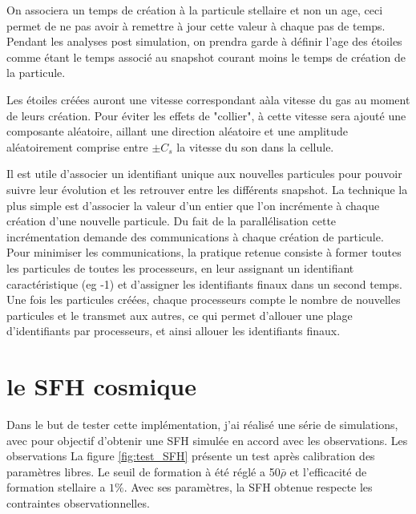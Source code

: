On associera un temps de création à la particule stellaire et non un age, ceci permet de ne pas avoir à remettre à jour cette valeur à chaque pas de temps.
Pendant les analyses post simulation, on prendra garde à définir l'age des étoiles comme étant le temps associé au snapshot courant moins le temps de création de la particule.

Les étoiles créées auront une vitesse correspondant aàla vitesse du gas au moment de leurs création.
Pour éviter les effets de "collier", à cette vitesse sera ajouté une composante aléatoire, aillant une direction aléatoire et une amplitude aléatoirement comprise entre $\pm C_s$ la vitesse du son dans la cellule.

Il est utile d'associer un identifiant unique aux nouvelles particules pour pouvoir suivre leur évolution et les retrouver entre les différents snapshot.
La technique la plus simple est d'associer la valeur d'un entier que l'on incrémente à chaque création d'une nouvelle particule.
Du fait de la parallélisation cette incrémentation demande des communications à chaque création de particule.
Pour minimiser les communications, la pratique retenue consiste à former toutes les particules de toutes les processeurs, en leur assignant un identifiant caractéristique (eg -1) et d'assigner les identifiants finaux dans un second temps.
Une fois les particules créées, chaque processeurs compte le nombre de nouvelles particules et le transmet aux autres, ce qui permet d'allouer une plage d'identifiants par processeurs, et ainsi allouer les identifiants finaux.

\section{le SFH cosmique}

Dans le but de tester cette implémentation, j'ai réalisé une série de simulations, avec pour objectif d'obtenir une \ac{SFH} simulée en accord avec les observations.
Les observations 
La figure \ref{fig:test_SFH} présente un test après calibration des paramètres libres.
Le seuil de formation à été réglé a 50$\bar{\rho}$ et l'efficacité de formation stellaire a $1\%$.
Avec ses paramètres, la \ac{SFH} obtenue respecte les contraintes observationnelles.

